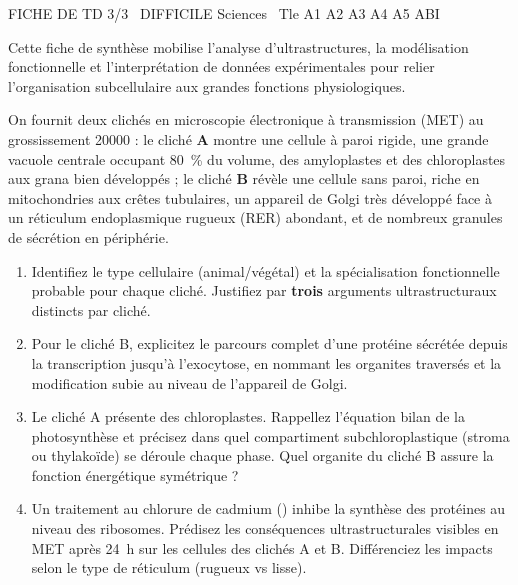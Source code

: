 \documentclass[11pt]{article}
\begin{document}
\begin{tcolorbox}[enhanced,colback=popink,colframe=popink,arc=10pt,boxrule=0pt,left=12pt,right=12pt,top=9pt,bottom=9pt]
{\color{white}\popxbold\small FICHE DE TD 3/3 \textbullet\ DIFFICILE \hfill Sciences \textbullet\ Tle A1 A2 A3 A4 A5 ABI\par}
\end{tcolorbox}
\vspace{4pt}
\noindent Cette fiche de synthèse mobilise l'analyse d'ultrastructures, la modélisation fonctionnelle et l'interprétation de données expérimentales pour relier l'organisation subcellulaire aux grandes fonctions physiologiques.

\begin{exercice}
On fournit deux clichés en microscopie électronique à transmission (MET) au grossissement \SI{20000}{\times} : le cliché \textbf{A} montre une cellule à paroi rigide, une grande vacuole centrale occupant \SI{80}{\%} du volume, des amyloplastes et des chloroplastes aux grana bien développés ; le cliché \textbf{B} révèle une cellule sans paroi, riche en mitochondries aux crêtes tubulaires, un appareil de Golgi très développé face à un réticulum endoplasmique rugueux (RER) abondant, et de nombreux granules de sécrétion en périphérie.
\begin{enumerate}
    \item Identifiez le type cellulaire (animal/végétal) et la spécialisation fonctionnelle probable pour chaque cliché. Justifiez par \textbf{trois} arguments ultrastructuraux distincts par cliché.
    \item Pour le cliché B, explicitez le parcours complet d'une protéine sécrétée depuis la transcription jusqu'à l'exocytose, en nommant les organites traversés et la modification subie au niveau de l'appareil de Golgi.
    \item Le cliché A présente des chloroplastes. Rappellez l'équation bilan de la photosynthèse et précisez dans quel compartiment subchloroplastique (stroma ou thylakoïde) se déroule chaque phase. Quel organite du cliché B assure la fonction énergétique symétrique ?
    \item Un traitement au chlorure de cadmium () inhibe la synthèse des protéines au niveau des ribosomes. Prédisez les conséquences ultrastructurales visibles en MET après \SI{24}{\hour} sur les cellules des clichés A et B. Différenciez les impacts selon le type de réticulum (rugueux vs lisse).
\end{enumerate}
\end{exercice}
\end{document}
